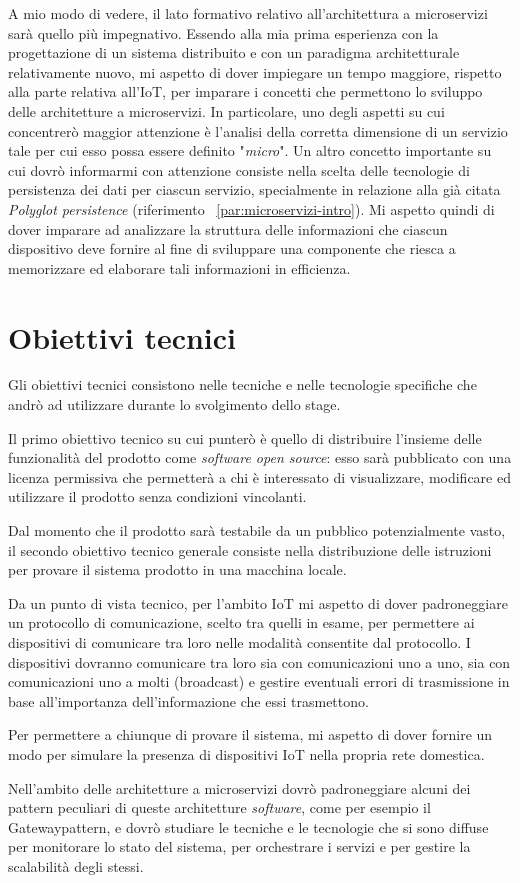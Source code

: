 A mio modo di vedere, il lato formativo relativo all'architettura a microservizi sarà quello più impegnativo.
Essendo alla mia prima esperienza con la progettazione di un sistema distribuito e con un paradigma architetturale relativamente nuovo, mi aspetto di dover impiegare un tempo maggiore, rispetto alla parte relativa all'IoT, per imparare i concetti che permettono lo sviluppo delle architetture a microservizi.
In particolare, uno degli aspetti su cui concentrerò maggior attenzione è l'analisi della corretta dimensione di un servizio tale per cui esso possa essere definito "\emph{micro}".
Un altro concetto importante su cui dovrò informarmi con attenzione consiste nella scelta delle tecnologie di persistenza dei dati per ciascun servizio, specialmente in relazione alla già citata \emph{Polyglot persistence} (riferimento ~\ref{par:microservizi-intro}).
Mi aspetto quindi di dover imparare ad analizzare la struttura delle informazioni che ciascun dispositivo deve fornire al fine di sviluppare una componente che riesca a memorizzare ed elaborare tali informazioni in efficienza.


\section{Obiettivi tecnici}

Gli obiettivi tecnici consistono nelle tecniche e nelle tecnologie specifiche che andrò ad utilizzare durante lo svolgimento dello stage.

Il primo obiettivo tecnico su cui punterò è quello di distribuire l'insieme delle funzionalità del prodotto come \emph{software open source}: esso sarà pubblicato con una licenza permissiva che permetterà a chi è interessato di visualizzare, modificare ed utilizzare il prodotto senza condizioni vincolanti.

Dal momento che il prodotto sarà testabile da un pubblico potenzialmente vasto, il secondo obiettivo tecnico generale consiste nella distribuzione delle istruzioni per provare il sistema prodotto in una macchina locale.

Da un punto di vista tecnico, per l'ambito IoT mi aspetto di dover padroneggiare un protocollo di comunicazione, scelto tra quelli in esame, per permettere ai dispositivi di comunicare tra loro nelle modalità consentite dal protocollo.
I dispositivi dovranno comunicare tra loro sia con comunicazioni uno a uno, sia con comunicazioni uno a molti (\gls{broadcast}) e gestire eventuali errori di trasmissione in base all'importanza dell'informazione che essi trasmettono.

Per permettere a chiunque di provare il sistema, mi aspetto di dover fornire un modo per simulare la presenza di dispositivi IoT nella propria rete domestica.

Nell'ambito delle architetture a microservizi dovrò padroneggiare alcuni dei \gls{pattern} peculiari di queste architetture \emph{software}, come per esempio il \gls{Gatewaypattern}, e dovrò studiare le tecniche e le tecnologie che si sono diffuse per monitorare lo stato del sistema, per orchestrare i servizi e per gestire la scalabilità degli stessi.
